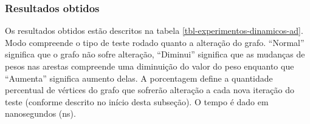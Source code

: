 \subsubsection{Resultados obtidos}
\label{sec-experimentos-dinamicos-ad-resultados}

Os resultados obtidos estão descritos na tabela \ref{tbl-experimentos-dinamicos-ad}. Modo compreende o tipo de teste rodado quanto a alteração do grafo. ``Normal'' significa que o grafo não sofre alteração, ``Diminui'' significa que as mudanças de pesos nas arestas compreende uma diminuição do valor do peso enquanto que ``Aumenta'' significa aumento delas. A porcentagem define a quantidade percentual de vértices do grafo que sofrerão alteração a cada nova iteração do teste (conforme descrito no início desta subseção). O tempo é dado em nanosegundos (ns).

